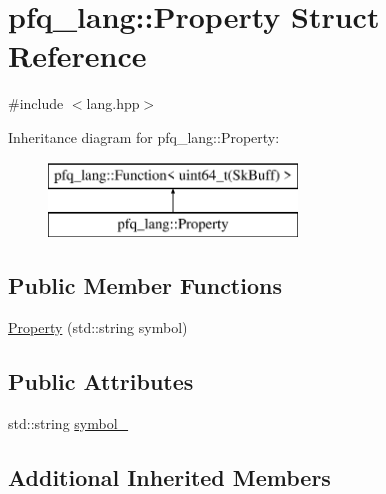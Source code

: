 \hypertarget{structpfq__lang_1_1Property}{\section{pfq\+\_\+lang\+:\+:Property Struct Reference}
\label{structpfq__lang_1_1Property}
}


{\ttfamily \#include $<$lang.\+hpp$>$}

Inheritance diagram for pfq\+\_\+lang\+:\+:Property\+:\begin{figure}[H]
\begin{center}
\leavevmode
\includegraphics[height=2.000000cm]{structpfq__lang_1_1Property}
\end{center}
\end{figure}
\subsection*{Public Member Functions}
\begin{DoxyCompactItemize}
\item 
\hyperlink{structpfq__lang_1_1Property_a59dc13f20077530b8388cfc7d4e9565b}{Property} (std\+::string symbol)
\end{DoxyCompactItemize}
\subsection*{Public Attributes}
\begin{DoxyCompactItemize}
\item 
std\+::string \hyperlink{structpfq__lang_1_1Property_a60ee4a17e077da3243ded2defb8c4437}{symbol\+\_\+}
\end{DoxyCompactItemize}
\subsection*{Additional Inherited Members}


